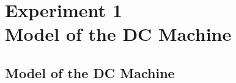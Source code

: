 \documentclass[12pt,a4paper, openany]{book}
\begin{document}




\setcounter{chapter}{0} %
\chapter{Experiment 1 \\ Model of the DC Machine}

 \setcounter{section}{4} %
\section{Model of the DC Machine}
\end{document}
